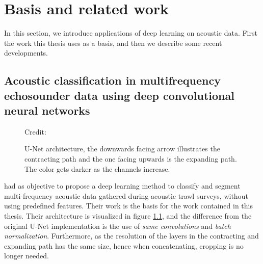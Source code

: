 \chapter{Basis and related work} \label{computer vision}
    In this section, we introduce applications of deep learning on acoustic data. First the work this thesis uses as a basis, and then we describe some recent developments.
    

    


\section{Acoustic classification in multifrequency echosounder data using
deep convolutional neural networks} \label{unet_paper_acoustic}
    
        \begin{figure}[H]
        \centering
        
        \caption[U-Net architecture]{U-Net architecture, the downwards facing arrow illustrates the contracting path and the one facing upwards is the expanding path. The color gets darker as the channels increase.}
      	\medskip 
        \label{unet__brautset_fig}
        \hspace*{15pt}\hbox{\scriptsize Credit: \citeauthor{brautaset2020acoustic}\cite{brautaset2020acoustic}}
    \end{figure}
    
    
    \citeauthor{brautaset2020acoustic}\cite{brautaset2020acoustic} had as objective to propose a deep learning method to classify and segment multi-frequency acoustic data gathered during acoustic trawl surveys, without using predefined features. Their work is the basis for the work contained in this thesis. Their architecture is visualized in figure \ref{unet__brautset_fig}, and the difference from the original U-Net implementation is the use of \textit{same convolutions} and \textit{batch normalization}. Furthermore, as the resolution of the layers in the contracting and expanding path has the same size, hence when concatenating, cropping is no longer needed.
    
